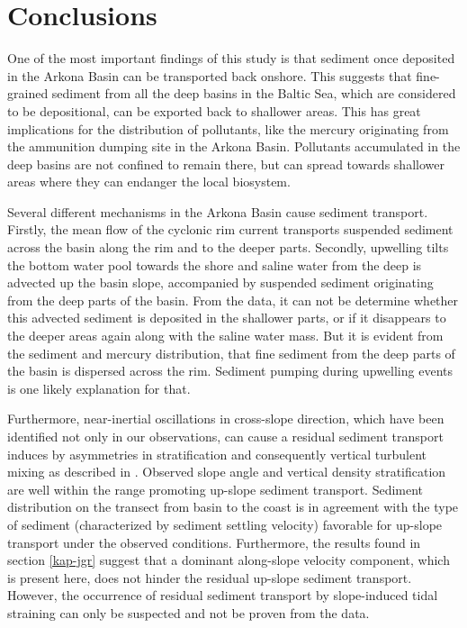 \section{Conclusions}

One of the most important findings of this study is that sediment once 
deposited in the Arkona Basin can be transported back onshore. 
This suggests that fine-grained sediment from all the deep basins in the Baltic 
Sea, which are considered to be depositional, can be exported back to 
shallower areas. This has great implications for the distribution of 
pollutants, like the mercury originating from the ammunition dumping site in the 
Arkona Basin. Pollutants accumulated in the deep basins are not confined to 
remain there, but can spread towards shallower areas where they can endanger the 
local biosystem.

Several different mechanisms in the Arkona Basin cause sediment transport. 
Firstly, the mean flow of the cyclonic rim current transports suspended 
sediment across the basin along the rim and to the deeper parts.
Secondly, upwelling tilts the bottom water pool towards the shore and saline 
water from the deep is advected up the basin slope, accompanied by 
suspended sediment originating from the deep parts of the basin. From the data, 
it can not be determine whether this advected sediment is deposited in the 
shallower parts, or if it disappears to the deeper areas again along with the 
saline water mass. But it is evident from the sediment and mercury 
distribution, that fine sediment from the deep parts of the basin is dispersed 
across the rim. Sediment pumping during upwelling events is one likely 
explanation for that.

Furthermore, near-inertial oscillations in cross-slope direction, which have 
been identified not only in our observations, can cause a residual sediment 
transport induces by asymmetries in stratification and consequently vertical 
turbulent mixing as described in \cite{schulzumlauf2016}. Observed slope angle 
and vertical density stratification are well within the range promoting up-slope 
sediment transport. Sediment distribution on the transect from basin to the 
coast is in agreement with the type of sediment (characterized by sediment 
settling velocity) favorable for up-slope transport under the observed 
conditions. Furthermore, the results found in section \ref{kap-jgr} suggest 
that a dominant along-slope velocity component, which is present here, does not 
hinder the residual up-slope sediment transport. However, the occurrence of 
residual sediment transport by slope-induced tidal straining can only be 
suspected and not be proven from the data.
